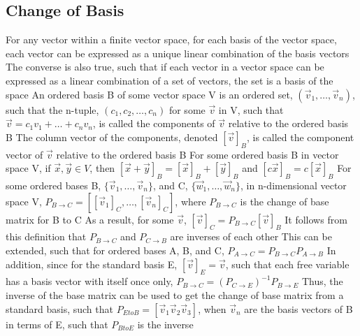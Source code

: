 \documentclass[11 pt, twoside]{article}
\newenvironment{outline*}
{
	\begin{outline}[enumerate]
	}
	{\end{outline}
}
\begin{document}
\subsection{Change of Basis}
\begin{outline*}
\1 For any vector within a finite vector space, for each basis of the vector space, each vector can be expressed as a unique linear combination of the basis vectors
\2 The converse is also true, such that if each vector in a vector space can be expressed as a linear combination of a set of vectors, the set is a basis of the space
\1 An ordered basis B of some vector space V is an ordered set, $(\vec{v}_1, \dots, \vec{v}_n)$, such that the n-tuple, $(c_1, c_2, \dots, c_n)$ for some $\vec{v}$ in V, such that $\vec{v} = c_1v_1 + \dots + c_nv_n$, is called the components of $\vec{v}$ relative to the ordered basis B
\2 The column vector of the components, denoted $[\vec{v}]_B$, is called the component vector of  $\vec{v}$ relative to the ordered basis B
\1 For some ordered basis B in vector space V, if $\vec{x}, \vec{y} \in V$, then $[\vec{x} + \vec{y}]_B = [\vec{x}]_B + [\vec{y}]_B$ and $[c\vec{x}]_B = c[\vec{x}]_B$
\1 For some ordered bases B, $\{\vec{v}_1, \dots, \vec{v}_n\}$, and C, $\{\vec{w}_1, \dots, \vec{w}_n\}$, in n-dimensional vector space V, $P_{B \to C} = [[\vec{v}_1]_C, \dots, [\vec{v}_n]_C]$, where $P_{B \to C}$ is the change of base matrix for B to C
\2 As a result, for some $\vec{v}$, $[\vec{v}]_C = P_{B \to C}[\vec{v}]_B$
\2 It follows from this definition that $P_{B \to C}$ and $P_{C \to B}$ are inverses of each other
\3 This can be extended, such that for ordered bases A, B, and C, $P_{A \to C} = P_{B \to C}P_{A \to B}$
\3 In addition, since for the standard basis E, $[\vec{v}]_E = \vec{v}$, such that each free variable has a basis vector with itself once only, $P_{B \to C} = (P_{C \to E})^{-1}P_{B \to E}$
\3 Thus, the inverse of the base matrix can be used to get the change of base matrix from a standard basis, such that $P_{E to B} = [\vec{v}_1 \vec{v}_2 \vec{v}_3]$, when $\vec{v}_n$ are the basis vectors of B in terms of E, such that $P_{B to E}$ is the inverse
\end{outline*}
\end{document}
